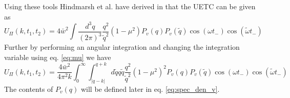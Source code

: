\iffalse
The Fourier transformation of the velocity field can be denoted as
\cite[eq. 3.13]{hindmarsh_gw_pt_2019}
\begin{equation}
\tilde{v}_\mathbb{q}^i(t) = \int d^3 xv^i (\mathbb{x},t) e^{-i \mathbb{q} \cdot \mathbb{x}}.
\end{equation}
We use the same result as in \cite{hindmarsh_gw_pt_2019} that the velocity field is irrotational and statistically homogenous,
and the two-point function $G$ can therefore be written as
\begin{equation}
\langle \tilde{v}_{\mathbb{q}_1}^i (t_1) \tilde{v}_{\mathbb{q}_2}^{*j} (t2) \rangle = \hat{q}_1^i \hat{q}_2^j G(q_1, t_1, t_2) (2\pi)^3 \delta(\mathbb{q_1} - \mathbb{q_2}).
\end{equation}
The leading term for the shear stress UETC of eq. \eqref{eq:uetc_final} is therefore
\fi

Using these tools Hindmarsh et al. have derived in \cite{hindmarsh_gw_pt_2019} that the UETC can be given as
\cite[eq. 3.32]{hindmarsh_gw_pt_2019}
\begin{equation}
U_\Pi(k, t_1, t_2) = 4 \bar{w}^2 \int \frac{d^3 q}{(2\pi)^3} \frac{q^2}{\tilde{q}^2} (1 - \mu^2) P_v(q) P_v(\tilde{q}) \cos (\omega t_-) \cos (\tilde{\omega} t_-)
\end{equation}
Further by performing an angular integration and changing the integration variable using eq. \eqref{eq:mu} we have
\cite[eq. 3.34]{hindmarsh_gw_pt_2019}
\begin{equation}
U_\Pi (k, t_1, t_2) = \frac{4 \bar{w}^2}{4 \pi^2 k} \int_0^\infty \int_{|q-k|}^{q+k} d\tilde{q} q \tilde{q}
\frac{q^2}{\tilde{q}^2} (1-\mu^2)^2
P_v(q) P_v(\tilde{q})
\cos (\omega t_-) \cos (\tilde{\omega} t_-)
\label{eq:uetc_final}
\end{equation}
The contents of $P_v(q)$ will be defined later in eq. \eqref{eq:spec_den_v}.


